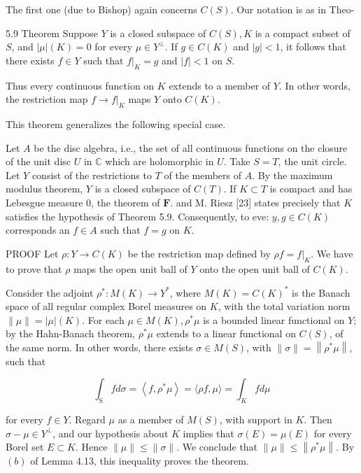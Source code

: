 \documentclass[10pt]{article}
\begin{document}
The first one (due to Bishop) again concerns $C(S)$. Our notation is as in Theo-

5.9 Theorem Suppose $Y$ is a closed subspace of $C(S), K$ is a compact subset of $S$, and $|\mu|(K)=0$ for every $\mu \in Y^{\perp}$. If $g \in C(K)$ and $|g|<1$, it follows that there exists $f \in Y$ such that $\left.f\right|_{K}=g$ and $|f|<1$ on $S$.

Thus every continuous function on $K$ extends to a member of $Y$. In other words, the restriction map $\left.f \rightarrow f\right|_{K}$ maps $Y$ onto $C(K)$.

This theorem generalizes the following special case.

Let $A$ be the disc algebra, i.e., the set of all continuous functions on the closure of the unit disc $U$ in $\mathbb{C}$ which are holomorphic in $U$. Take $S=T$, the unit circle. Let $Y$ consist of the restrictions to $T$ of the members of $A$. By the maximum modulus theorem, $Y$ is a closed subspace of $C(T)$. If $K \subset T$ is compact and has Lebesgue measure 0, the theorem of $\mathbf{F}$. and M. Riesz [23] states precisely that $K$ satisfies the hypothesis of Theorem 5.9. Consequently, to eve: $y, g \in C(K)$ corresponds an $f \in A$ such that $f=g$ on $K$.

PROOF Let $\rho: Y \rightarrow C(K)$ be the restriction map defined by $\rho f=\left.f\right|_{K}$. We have to prove that $\rho$ maps the open unit ball of $Y$ onto the open unit ball of $C(K)$.

Consider the adjoint $\rho^{*}: M(K) \rightarrow Y^{*}$, where $M(K)=C(K)^{*}$ is the Banach space of all regular complex Borel measures on $K$, with the total variation norm $\|\mu\|=|\mu|(K)$. For each $\mu \in M(K), \rho^{*} \mu$ is a bounded linear functional on $Y$; by the Hahn-Banach theorem, $\rho^{*} \mu$ extends to a linear functional on $C(S)$, of the same norm. In other words, there exists $\sigma \in M(S)$, with $\|\sigma\|=\left\|\rho^{*} \mu\right\|$, such that

$$
\int_{\mathrm{S}} f d \sigma=\left\langle f, \rho^{*} \mu\right\rangle=\langle\rho f, \mu\rangle=\int_{K} f d \mu
$$

for every $f \in Y$. Regard $\mu$ as a member of $M(S)$, with support in $K$. Then $\sigma-\mu \in Y^{\perp}$, and our hypothesis about $K$ implies that $\sigma(E)=\mu(E)$ for every Borel set $E \subset K$. Hence $\|\mu\| \leq\|\sigma\|$. We conclude that $\|\mu\| \leq\left\|\rho^{*} \mu\right\|$. By $(b)$ of Lemma 4.13, this inequality proves the theorem.
\end{document}
